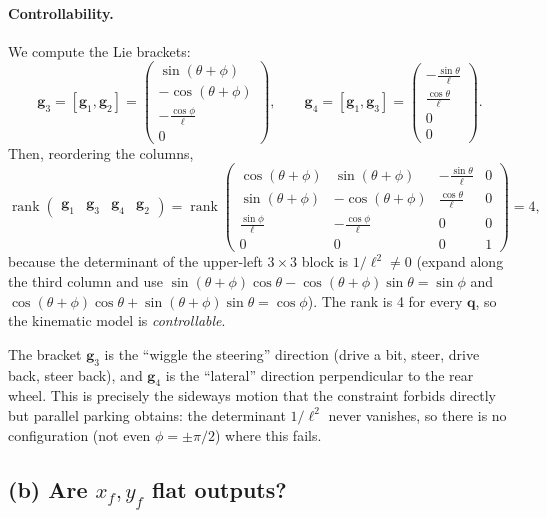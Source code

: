 \documentclass[11pt,a4paper]{article}
\theoremstyle{definition}
\theoremstyle{plain}
\theoremstyle{remark}
\newcommand{\q}{\boldsymbol{q}}
\newcommand{\g}{\boldsymbol{g}}
\newcommand{\rank}{\operatorname{rank}}
\begin{document}
\paragraph{Controllability.} We compute the Lie brackets:
\[
  \g_3=[\g_1,\g_2]=\begin{pmatrix}\sin(\theta+\phi)\\-\cos(\theta+\phi)\\-\frac{\cos\phi}{\ell}\\0\end{pmatrix},\qquad
  \g_4=[\g_1,\g_3]=\begin{pmatrix}-\frac{\sin\theta}{\ell}\\ \frac{\cos\theta}{\ell}\\0\\0\end{pmatrix}.
\]
Then, reordering the columns,
\[
  \rank\begin{pmatrix}\g_1&\g_3&\g_4&\g_2\end{pmatrix}=
  \rank\begin{pmatrix}
    \cos(\theta+\phi)&\sin(\theta+\phi)&-\frac{\sin\theta}{\ell}&0\\
    \sin(\theta+\phi)&-\cos(\theta+\phi)&\frac{\cos\theta}{\ell}&0\\
    \frac{\sin\phi}{\ell}&-\frac{\cos\phi}{\ell}&0&0\\
    0&0&0&1
  \end{pmatrix}=4,
\]
because the determinant of the upper-left $3\times3$ block is $1/\ell^2\neq0$ (expand along the third column and use $\sin(\theta+\phi)\cos\theta-\cos(\theta+\phi)\sin\theta=\sin\phi$ and $\cos(\theta+\phi)\cos\theta+\sin(\theta+\phi)\sin\theta=\cos\phi$). The rank is 4 for every $\q$, so the kinematic model is \emph{controllable}.

\begin{intuition}
The bracket $\g_3$ is the ``wiggle the steering'' direction (drive a bit, steer, drive back, steer back), and $\g_4$ is the ``lateral'' direction perpendicular to the rear wheel. This is precisely the sideways motion that the constraint forbids directly but parallel parking obtains: the determinant $1/\ell^2$ never vanishes, so there is no configuration (not even $\phi=\pm\pi/2$) where this fails.
\end{intuition}

\subsection{(b) Are $x_f,y_f$ flat outputs?}
\end{document}
